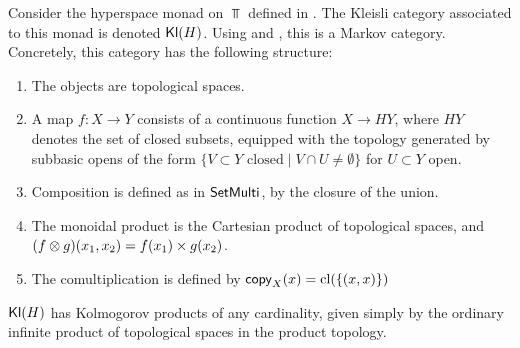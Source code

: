 \documentclass[11pt]{article}
\begin{document}
\begin{definition}
    Consider the hyperspace monad on $\Top$ defined in \cite[Definition~2.4]{hyperspace}.
    The Kleisli category associated to this monad is denoted $\operatorname{\mathsf{Kl}}(H)$.
    Using \cite[Corollary~2.53]{hyperspace} and \cite[Proposition~3.1]{markov_cats}, this is a Markov category.
    Concretely, this category has the following structure:
    \begin{enumerate}
        \item The objects are topological spaces.
        \item A map $f: X \to Y$ consists of a continuous function $X \to HY$, where $HY$ denotes the set of closed subsets, equipped with the topology generated by subbasic opens of the form $\{V \subset Y \text{ closed} \mid V \cap U \neq \emptyset\}$ for $U \subset Y$ open.
        \item Composition is defined as in $\operatorname{\mathsf{SetMulti}}$, by the closure of the union.
        \item The monoidal product is the Cartesian product of topological spaces, and $(f \otimes g)(x_1,x_2) = f(x_1) \times g(x_2)$.
        \item The comultiplication is defined by $\mathsf{copy}_{X}(x) = \operatorname{cl}(\{(x,x)\})$
    \end{enumerate}
\end{definition}
\begin{proposition}
    $\operatorname{\mathsf{Kl}}(H)$ has Kolmogorov products of any cardinality, given simply by the ordinary infinite product of topological spaces in the product topology.
\end{proposition}
\end{document}
